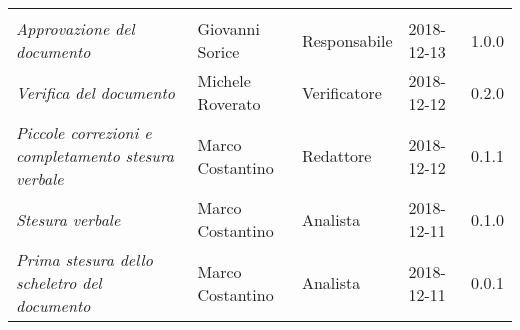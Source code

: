 \newpage 
\section*{}
\begin{table}[H]
	\centering
	\begin{tabular}{p{4cm}|C{3cm}|C{3cm}|R{2.5cm}|R{2cm}}
		
		 & & & & \\
		
		
		\emph{Approvazione del documento} & Giovanni Sorice & Responsabile & 2018-12-13 & 1.0.0 \\
		\hline
		
		\emph{Verifica del documento} & Michele Roverato & Verificatore & 2018-12-12 & 0.2.0 \\
		\hline

		\emph{Piccole correzioni e completamento stesura verbale} & Marco Costantino & Redattore& 2018-12-12 & 0.1.1 \\
		\hline

		\emph{Stesura verbale} & Marco Costantino & Analista & 2018-12-11 & 0.1.0 \\
		\hline
		
		\emph{Prima stesura dello scheletro del documento} & Marco Costantino & Analista & 2018-12-11 & 0.0.1 \\
		
	\end{tabular}
	
\end{table}


\clearpage